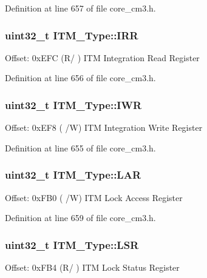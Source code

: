 Definition at line 657 of file core\+\_\+cm3.\+h.

\subsubsection[{\texorpdfstring{I\+RR}{IRR}}]{ uint32\+\_\+t I\+T\+M\+\_\+\+Type\+::\+I\+RR}\hypertarget{structITM__Type_a212a614a8d5f2595e5eb049e5143c739}{}\label{structITM__Type_a212a614a8d5f2595e5eb049e5143c739}
Offset\+: 0x\+E\+FC (R/ ) I\+TM Integration Read Register 

Definition at line 656 of file core\+\_\+cm3.\+h.

\subsubsection[{\texorpdfstring{I\+WR}{IWR}}]{ uint32\+\_\+t I\+T\+M\+\_\+\+Type\+::\+I\+WR}\hypertarget{structITM__Type_afd0e0c051acd3f6187794a4e8dc7e7ea}{}\label{structITM__Type_afd0e0c051acd3f6187794a4e8dc7e7ea}
Offset\+: 0x\+E\+F8 ( /W) I\+TM Integration Write Register 

Definition at line 655 of file core\+\_\+cm3.\+h.

\subsubsection[{\texorpdfstring{L\+AR}{LAR}}]{ uint32\+\_\+t I\+T\+M\+\_\+\+Type\+::\+L\+AR}\hypertarget{structITM__Type_a97840d39a9c63331e3689b5fa69175e9}{}\label{structITM__Type_a97840d39a9c63331e3689b5fa69175e9}
Offset\+: 0x\+F\+B0 ( /W) I\+TM Lock Access Register 

Definition at line 659 of file core\+\_\+cm3.\+h.

\subsubsection[{\texorpdfstring{L\+SR}{LSR}}]{ uint32\+\_\+t I\+T\+M\+\_\+\+Type\+::\+L\+SR}\hypertarget{structITM__Type_aaa0515b1f6dd5e7d90b61ef67d8de77b}{}\label{structITM__Type_aaa0515b1f6dd5e7d90b61ef67d8de77b}
Offset\+: 0x\+F\+B4 (R/ ) I\+TM Lock Status Register 

